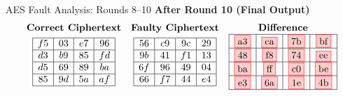 \documentclass{beamer}
\newenvironment{tres important}[2][]{
	\setkeys{EmphEqEnv}{#2}
	\setkeys{EmphEqOpt}{box={\setlength{\fboxsep}{10pt}\fcolorbox{myNewColorA}{white}},#1}
	\EmphEqMainEnv}
{\endEmphEqMainEnv}
\begin{document}
\begin{frame}[fragile]{AES Fault Analysis: Rounds 8–10}
    \vspace{1mm}
    \textbf{After Round 10 (Final Output)}
    \[
    \begin{array}{ccc}
    \textbf{Correct Ciphertext} & \textbf{Faulty Ciphertext} & \textbf{Difference} \\
    \begin{array}{|c|c|c|c|} \hline
    f5 & 03 & e7 & 96 \\ \hline
    d3 & b9 & 85 & fd \\ \hline
    d5 & 69 & 89 & ba \\ \hline
    85 & 9d & 5a & af \\ \hline
    \end{array}
    &
    \begin{array}{|c|c|c|c|} \hline
    56 & c9 & 9c & 29 \\ \hline
    9b & 41 & f1 & 13 \\ \hline
    6f & 96 & 49 & 04 \\ \hline
    66 & f7 & 44 & e4 \\ \hline
    \end{array}
    &
    \begin{array}{|c|c|c|c|} \hline
    \fcolorbox{red}{red!20}{a3} & \fcolorbox{red}{red!20}{ca} & \fcolorbox{red}{red!20}{7b} & \fcolorbox{red}{red!20}{bf} \\ \hline
    \fcolorbox{red}{red!20}{48} & \fcolorbox{red}{red!20}{f8} & \fcolorbox{red}{red!20}{74} & \fcolorbox{red}{red!20}{ee} \\ \hline
    \fcolorbox{red}{red!20}{ba} & \fcolorbox{red}{red!20}{ff} & \fcolorbox{red}{red!20}{c0} & \fcolorbox{red}{red!20}{be} \\ \hline
    \fcolorbox{red}{red!20}{e3} & \fcolorbox{red}{red!20}{6a} & \fcolorbox{red}{red!20}{1e} & \fcolorbox{red}{red!20}{4b} \\ \hline
    \end{array}
    \end{array}
    \]
    
    \end{frame}
\end{document}
